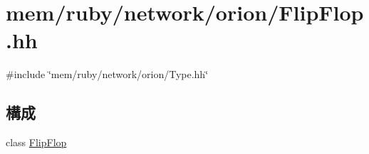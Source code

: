 \hypertarget{FlipFlop_8hh}{
\section{mem/ruby/network/orion/FlipFlop.hh}
\label{FlipFlop_8hh}
}
{\ttfamily \#include \char`\"{}mem/ruby/network/orion/Type.hh\char`\"{}}\par
\subsection*{構成}
\begin{DoxyCompactItemize}
\item 
class \hyperlink{classFlipFlop}{FlipFlop}
\end{DoxyCompactItemize}

